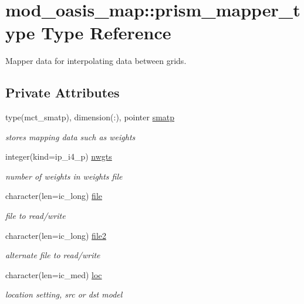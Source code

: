 \hypertarget{structmod__oasis__map_1_1prism__mapper__type}{}\section{mod\+\_\+oasis\+\_\+map\+:\+:prism\+\_\+mapper\+\_\+type Type Reference}
\label{structmod__oasis__map_1_1prism__mapper__type}


Mapper data for interpolating data between grids.  


\subsection*{Private Attributes}
\begin{DoxyCompactItemize}
\item 
type(mct\+\_\+smatp), dimension(\+:), pointer \hyperlink{structmod__oasis__map_1_1prism__mapper__type_a46e59a2d0c41fc11532e14ef413522f1}{smatp}
\begin{DoxyCompactList}\small\item\em stores mapping data such as weights \end{DoxyCompactList}\item 
integer(kind=ip\+\_\+i4\+\_\+p) \hyperlink{structmod__oasis__map_1_1prism__mapper__type_a90bcd6831549c027de72dbba1daa0939}{nwgts}
\begin{DoxyCompactList}\small\item\em number of weights in weights file \end{DoxyCompactList}\item 
character(len=ic\+\_\+long) \hyperlink{structmod__oasis__map_1_1prism__mapper__type_a10ad0d8412afdfa993728ac63e117e9e}{file}
\begin{DoxyCompactList}\small\item\em file to read/write \end{DoxyCompactList}\item 
character(len=ic\+\_\+long) \hyperlink{structmod__oasis__map_1_1prism__mapper__type_a6d8ffe110f767fb9fe6bfebd5198ef03}{file2}
\begin{DoxyCompactList}\small\item\em alternate file to read/write \end{DoxyCompactList}\item 
character(len=ic\+\_\+med) \hyperlink{structmod__oasis__map_1_1prism__mapper__type_a37a969cc8b9d9234e6e99c6d3ef144ad}{loc}
\begin{DoxyCompactList}\small\item\em location setting, src or dst model \end{DoxyCompactList}\item 

\end{DoxyCompactItemize}
